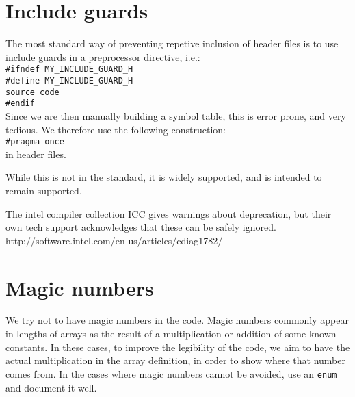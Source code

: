\documentclass[a4paper,10pt]{article}
\begin{document}
\section{Include guards}
The most standard way of preventing repetive inclusion of header files is to use include guards in a preprocessor directive, i.e.:\\
\verb|#ifndef MY_INCLUDE_GUARD_H|\\
\verb|#define MY_INCLUDE_GUARD_H|\\
\verb|source code|\\
\verb|#endif|\\
Since we are then manually building a symbol table, this is error prone, and very tedious. We therefore use the following construction:\\
\verb|#pragma once|\\
in header files.

While this is not in the standard, it is widely supported, and is intended to remain supported.

The intel compiler collection ICC gives warnings about deprecation, but their own tech support acknowledges that these can be safely ignored.\\
http://software.intel.com/en-us/articles/cdiag1782/
\section{Magic numbers}
We try not to have magic numbers in the code. Magic numbers commonly appear in lengths of arrays as the result of a multiplication or addition of some known constants. In these cases, to improve the legibility of the code, we aim to have the actual multiplication in the array definition, in order to show where that number comes from. In the cases where magic numbers cannot be avoided, use an \verb|enum| and document it well.
\end{document}
